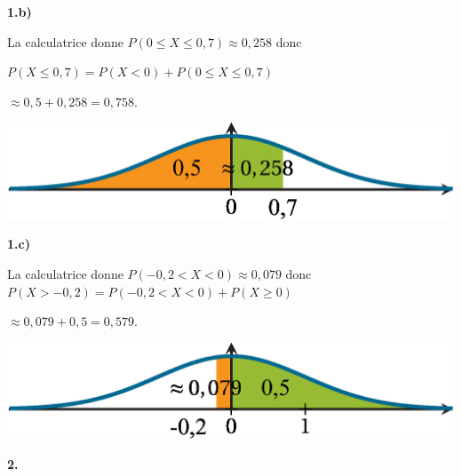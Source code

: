 \documentclass{cornouaille}
\begin{document}
\begin{methode}
\textbf{1.b) } ~~


\begin{minipage}{0.6\linewidth}
La calculatrice donne $P(0\leqslant X\leqslant 0,7)\approx 0,258$ donc

$P(X\leqslant 0,7)=P(X<0)+P(0\leqslant X\leqslant 0,7)$

$\approx 0,5+0,258=0,758$.
\end{minipage}

\hfill

\begin{minipage}{0.4\linewidth}



\includegraphics{./TS-Variables-6}



\end{minipage}




\textbf{1.c) } ~~





\begin{minipage}{0.6\linewidth}
La calculatrice donne $P(-0,2<X<0)\approx 0,079$ donc
$P(X>-0,2)=P(-0,2<X<0)+P(X\geqslant 0)$

$\approx 0,079+0,5=0,579$.
\end{minipage}

\hfill

\begin{minipage}{0.4\linewidth}



\includegraphics{./TS-Variables-7}



\end{minipage}






\textbf{2. }





\end{methode}
\end{document}
